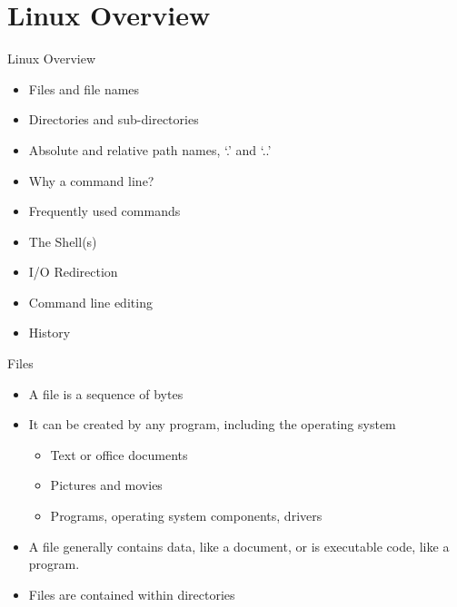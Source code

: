 \documentclass[graphics]{beamer}
\begin{document}
\section{Linux Overview}
\begin{frame}{Linux Overview}
    \begin{itemize}
        \item Files and file names
        \item Directories and sub-directories
        \item Absolute and relative path names, `.' and `..'
        \item Why a command line?
        \item Frequently used commands
        \item The Shell(s)
        \item I/O Redirection
        \item Command line editing
        \item History
    \end{itemize}
\end{frame}

\begin{frame}{Files}
    \begin{itemize}
        \item A file is a sequence of bytes
        \item It can be created by any program, including the operating system
        \begin{itemize}
            \item Text or office documents
            \item Pictures and movies
            \item Programs, operating system components, drivers
        \end{itemize}
        \item A file generally contains data, like a document, or is executable code, like a program.
        \item Files are contained within directories
    \end{itemize}
\end{frame}
\end{document}

